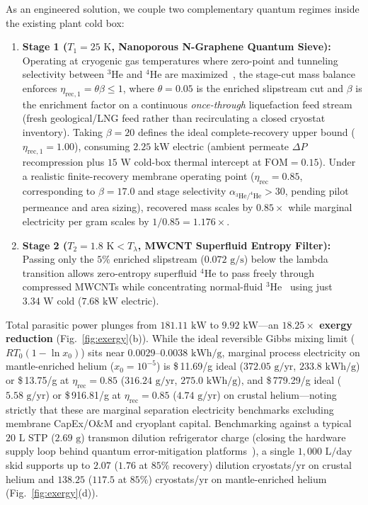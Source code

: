 \documentclass[11pt,a4paper]{article}
\begin{document}
As an engineered solution, we couple two complementary quantum regimes inside the existing plant cold box:
\begin{enumerate}
\item \textbf{Stage 1 ($T_1 = 25\text{ K}$, Nanoporous N-Graphene Quantum Sieve):} Operating at cryogenic gas temperatures where zero-point and tunneling selectivity between $^3\mathrm{He}$ and $^4\mathrm{He}$ are maximized~\cite{hauser2012}, the stage-cut mass balance enforces $\eta_{\mathrm{rec,1}} = \theta \beta \le 1$, where $\theta = 0.05$ is the enriched slipstream cut and $\beta$ is the enrichment factor on a continuous \emph{once-through} liquefaction feed stream (fresh geological/LNG feed rather than recirculating a closed cryostat inventory). Taking $\beta = 20$ defines the ideal complete-recovery upper bound ($\eta_{\mathrm{rec,1}} = 1.00$), consuming $2.25\text{ kW}$ electric (ambient permeate $\Delta P$ recompression plus $15\text{ W}$ cold-box thermal intercept at $\mathrm{FOM}=0.15$). Under a realistic finite-recovery membrane operating point ($\eta_{\mathrm{rec}} = 0.85$, corresponding to $\beta = 17.0$ and stage selectivity $\alpha_{^3\mathrm{He}/^4\mathrm{He}} > 30$, pending pilot permeance and area sizing), recovered mass scales by $0.85\times$ while marginal electricity per gram scales by $1/0.85 = 1.176\times$.
\item \textbf{Stage 2 ($T_2 = 1.8\text{ K} < T_\lambda$, MWCNT Superfluid Entropy Filter):} Passing only the $5\%$ enriched slipstream ($0.072\text{ g/s}$) below the lambda transition allows zero-entropy superfluid $^4\mathrm{He}$ to pass freely through compressed MWCNTs while concentrating normal-fluid $^3\mathrm{He}$~\cite{niechcial2021} using just $3.34\text{ W}$ cold ($7.68\text{ kW}$ electric).
\end{enumerate}
Total parasitic power plunges from $181.11\text{ kW}$ to $9.92\text{ kW}$---an \textbf{$18.25\times$ exergy reduction} (Fig.~\ref{fig:exergy}(b)). While the ideal reversible Gibbs mixing limit ($R T_0 (1 - \ln x_0)$) sits near $0.0029\text{--}0.0038\text{ kWh/g}$, marginal process electricity on mantle-enriched helium ($x_0 = 10^{-5}$) is \$\,11.69/g ideal ($372.05\text{ g/yr}$, $233.8\text{ kWh/g}$) or \$\,13.75/g at $\eta_{\mathrm{rec}} = 0.85$ ($316.24\text{ g/yr}$, $275.0\text{ kWh/g}$), and \$\,779.29/g ideal ($5.58\text{ g/yr}$) or \$\,916.81/g at $\eta_{\mathrm{rec}} = 0.85$ ($4.74\text{ g/yr}$) on crustal helium---noting strictly that these are marginal separation electricity benchmarks excluding membrane CapEx/O\&M and cryoplant capital. Benchmarking against a typical $20\text{ L}$ STP ($2.69\text{ g}$) transmon dilution refrigerator charge (closing the hardware supply loop behind quantum error-mitigation platforms~\cite{olivaes2026zne}), a single $1{,}000\text{ L/day}$ skid supports up to $2.07$ ($1.76$ at $85\%$ recovery) dilution cryostats/yr on crustal helium and $138.25$ ($117.5$ at $85\%$) cryostats/yr on mantle-enriched helium (Fig.~\ref{fig:exergy}(d)).
\end{document}
